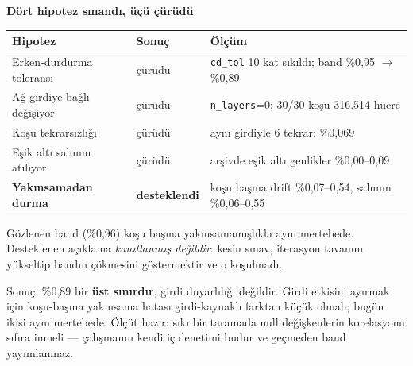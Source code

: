\documentclass[11pt,a4paper]{article}
\newcommand{\kkkenar}{lacivert}
\newcommand{\kkzemin}{kod}
\newenvironment{renkkutu}[3]{%
  \renewcommand{\kkkenar}{#1}\renewcommand{\kkzemin}{#2}%
  \par\medskip\noindent
  \begin{lrbox}{\kutugovde}%
  \begin{minipage}{\dimexpr\linewidth-2\fboxsep-2\fboxrule\relax}\footnotesize
  \textcolor{#1}{\textbf{#3}}\par\vspace{3pt}%
}{%
  \end{minipage}%
  \end{lrbox}%
  \noindent\fcolorbox{\kkkenar}{\kkzemin}{\usebox{\kutugovde}}%
  \par\medskip
}
\newenvironment{dikkat}[1]{\begin{renkkutu}{orta}{ortabg}{#1}}{\end{renkkutu}}
\begin{document}
\begin{dikkat}{Dört hipotez sınandı, üçü çürüdü}
\begin{center}\footnotesize
\begin{tabular}{@{}llp{5.1cm}@{}}
\toprule
Hipotez & Sonuç & Ölçüm \\
\midrule
Erken-durdurma toleransı & çürüdü & \texttt{cd\_tol} 10 kat sıkıldı; band
  \%0{,}95 $\rightarrow$ \%0{,}89 \\
Ağ girdiye bağlı değişiyor & çürüdü & \texttt{n\_layers}=0; 30/30 koşu
  316.514 hücre \\
Koşu tekrarsızlığı & çürüdü & aynı girdiyle 6 tekrar: \%0{,}069 \\
Eşik altı salınım atılıyor & çürüdü & arşivde eşik altı genlikler
  \%0{,}00--0{,}09 \\
\textbf{Yakınsamadan durma} & \textbf{desteklendi} & koşu başına drift
  \%0{,}07--0{,}54, salınım \%0{,}06--0{,}55 \\
\bottomrule
\end{tabular}
\end{center}

Gözlenen band (\%0{,}96) koşu başına yakınsamamışlıkla aynı mertebede.
Desteklenen açıklama \emph{kanıtlanmış değildir}: kesin sınav, iterasyon
tavanını yükseltip bandın çökmesini göstermektir ve o koşulmadı.
\end{dikkat}

\noindent Sonuç: \%0{,}89 bir \textbf{üst sınırdır}, girdi duyarlılığı
değildir. Girdi etkisini ayırmak için koşu-başına yakınsama hatası
girdi-kaynaklı farktan küçük olmalı; bugün ikisi aynı mertebede. Ölçüt hazır:
sıkı bir taramada null değişkenlerin korelasyonu sıfıra inmeli --- çalışmanın
kendi iç denetimi budur ve geçmeden band yayımlanmaz.
\end{document}
